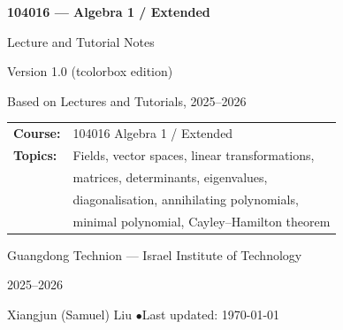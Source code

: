 \begin{titlepage}
\centering
\vspace*{3cm}
{\Huge\bfseries\color{defblue} 104016 --- Algebra 1 / Extended\par}
\vspace{0.8cm}
{\LARGE Lecture and Tutorial Notes \par}
\vspace{0.5cm}
{\large\color{defblue!70} Version 1.0 (tcolorbox edition)\par}
\vspace{1.5cm}
{\large Based on Lectures and Tutorials, 2025--2026\par}
\vspace{0.6cm}
\begin{tabular}{ll}
  \textbf{Course:}   & 104016 Algebra 1 / Extended \\
  \textbf{Topics:}   & Fields, vector spaces, linear transformations, \\
                     & matrices, determinants, eigenvalues, \\
                     & diagonalisation, annihilating polynomials, \\
                     & minimal polynomial, Cayley--Hamilton theorem \\
\end{tabular}\par
\vspace{1.5cm}
{\large Guangdong Technion --- Israel Institute of Technology\par}
\vspace{0.5cm}
{\large 2025--2026\par}
\vfill
{\small Xiangjun (Samuel) Liu \quad$\bullet$\quad Last updated: \today\par}
\end{titlepage}
